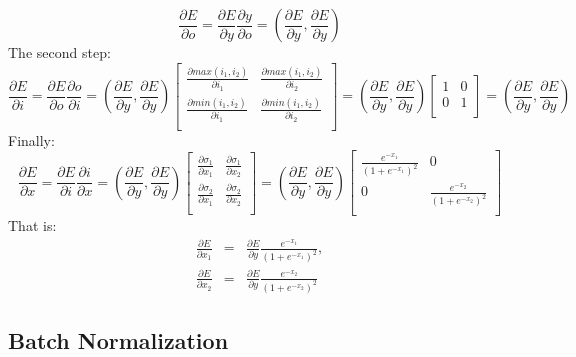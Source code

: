 \documentclass{article}
\begin{document}
$$
\frac{\partial E}{\partial o} =\frac{\partial E}{\partial y} \frac{\partial y}{\partial o}=(\frac{\partial E}{\partial y} ,\frac{\partial E}{\partial y} )
$$
The second step:
$$
\frac{\partial E}{\partial i} = \frac{\partial E}{\partial o} \frac{\partial o}{\partial i} =
(\frac{\partial E}{\partial y} ,\frac{\partial E}{\partial y} )
\begin{bmatrix}
 \frac{\partial max(i_1,i_2)}{\partial i_1}     & \frac{\partial max(i_1,i_2)}{\partial i_2}\\
\frac{\partial min(i_1,i_2)}{\partial i_1}     & \frac{\partial min(i_1,i_2)}{\partial i_2}   \\
\end{bmatrix}=
(\frac{\partial E}{\partial y} ,\frac{\partial E}{\partial y} )
\begin{bmatrix}
1 & 0\\
0 & 1  \\
\end{bmatrix}=(\frac{\partial E}{\partial y} ,\frac{\partial E}{\partial y} )
$$
Finally:
$$
\frac{\partial E}{\partial x}= \frac{\partial E}{\partial i} \frac{\partial i}{\partial x}=
(\frac{\partial E}{\partial y} ,\frac{\partial E}{\partial y} )
\begin{bmatrix}
\frac{\partial \sigma_1}{\partial x_1} & \frac{\partial \sigma_1}{\partial x_2}\\
\frac{\partial \sigma_2}{\partial x_1} & \frac{\partial \sigma_2}{\partial x_2} \\
\end{bmatrix}=
(\frac{\partial E}{\partial y} ,\frac{\partial E}{\partial y} )
\begin{bmatrix}
\frac{e^{-x_1}}{(1+e^{-x_1})^2}&0\\
0&\frac{e^{-x_2}}{(1+e^{-x_2})^2} \\
\end{bmatrix}
$$ 
That is:
\begin{eqnarray*}
\frac{\partial E}{\partial x_1}&=&\frac{\partial E}{\partial y}\frac{e^{-x_1}}{(1+e^{-x_1})^2},\\
\frac{\partial E}{\partial x_2}&=&\frac{\partial E}{\partial y}\frac{e^{-x_2}}{(1+e^{-x_2})^2}
\end{eqnarray*}

\subsection{Batch Normalization}
\end{document}
